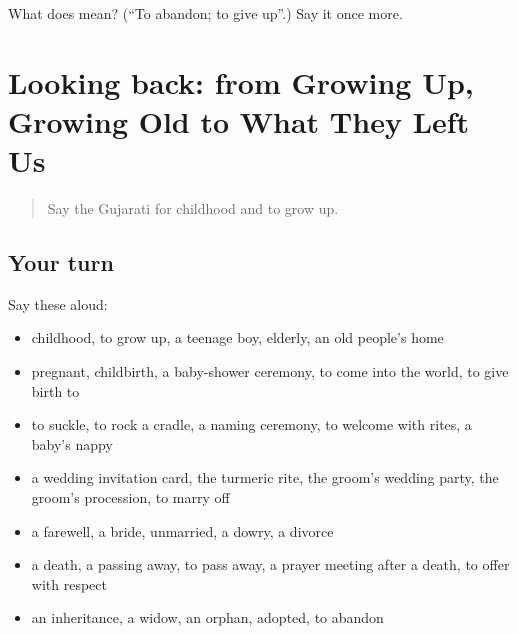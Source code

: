\begin{tcolorbox}[breakable,colback=teal!4,colframe=teal!35!black,title={Before you move on}]
What does  mean? (\textquotedblleft{}To abandon; to give up\textquotedblright{}.) Say it once more.
\end{tcolorbox}
\section[(dialogue)]{Looking back: from Growing Up, Growing Old to What They Left Us}

\label{lesson:GU-R500-review-494-500}



\begin{quote}
Say the Gujarati for childhood and to grow up.
\end{quote}

\subsection*{Your turn}
Say these aloud:

\begin{itemize}
\raggedright
  \item childhood, to grow up, a teenage boy, elderly, an old people's home
  \item pregnant, childbirth, a baby-shower ceremony, to come into the world, to give birth to
  \item to suckle, to rock a cradle, a naming ceremony, to welcome with rites, a baby's nappy
  \item a wedding invitation card, the turmeric rite, the groom's wedding party, the groom's procession, to marry off
  \item a farewell, a bride, unmarried, a dowry, a divorce
  \item a death, a passing away, to pass away, a prayer meeting after a death, to offer with respect
  \item an inheritance, a widow, an orphan, adopted, to abandon
\end{itemize}

